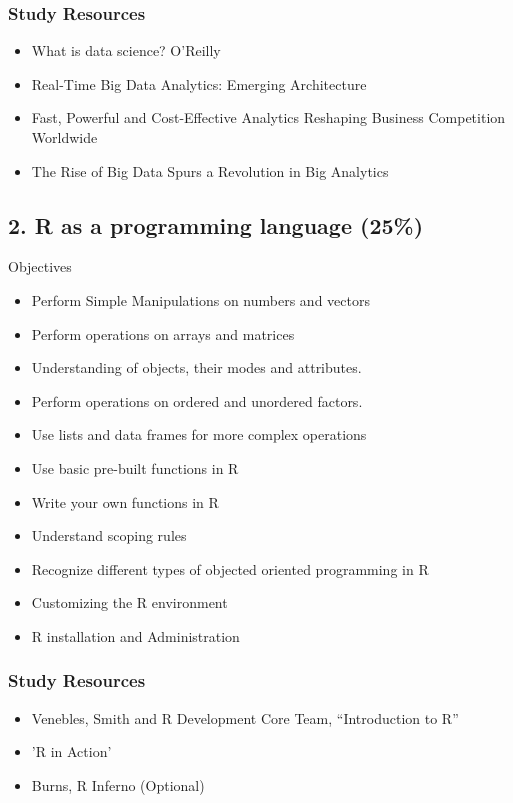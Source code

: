 \documentclass[]{article}
\begin{document}
\subsubsection*{Study Resources}
\begin{itemize}
	\item What is data science? O’Reilly
	\item Real-Time Big Data Analytics: Emerging Architecture
	\item Fast, Powerful and Cost-Effective Analytics Reshaping Business Competition Worldwide
	\item The Rise of Big Data Spurs a Revolution in Big Analytics
\end{itemize}

\newpage

\subsection*{2. R as a programming language (25\%)}

Objectives
\begin{itemize}
	\item Perform Simple Manipulations on numbers and vectors
	\item Perform operations on arrays and matrices
	\item Understanding of objects, their modes and attributes.
	\item Perform operations on ordered and unordered factors.
	\item Use lists and data frames for more complex operations
	\item Use basic pre-built functions in R
	\item Write your own functions in R
	\item Understand scoping rules
	\item Recognize different types of objected oriented programming in R
	\item Customizing the R environment
	\item R installation and Administration
\end{itemize} 
\subsubsection*{Study Resources}
\begin{itemize}
	\item Venebles, Smith and R Development Core Team, “Introduction to R”
	\item 'R in Action'
	\item Burns, R Inferno (Optional)
\end{itemize}
\newpage
\end{document}
